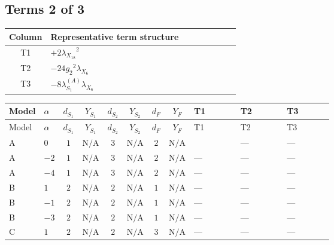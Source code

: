 \documentclass[8pt]{article}
\begin{document}
\begin{landscape}
\subsection*{Terms 2 of 3}
\begin{center}
\begin{tabular}{@{}c >{\raggedright\arraybackslash}p{0.82\linewidth}@{}}
\toprule
Column & Representative term structure \\
\midrule
T1 & \(\displaystyle +2 {\lambda_{X_{18}}}^2\) \\
\midrule
T2 & \(\displaystyle -24 {g_2}^2 {\lambda_{X_{6}}}\) \\
\midrule
T3 & \(\displaystyle -8 {\lambda_{S_1}^{(A)}} {\lambda_{X_{6}}}\) \\
\midrule
\bottomrule
\end{tabular}
\end{center}
\smallskip
\tiny
\begin{longtable}{@{}llcccccc >{\raggedright\arraybackslash}p{0.21\linewidth} >{\raggedright\arraybackslash}p{0.21\linewidth} >{\raggedright\arraybackslash}p{0.21\linewidth}@{}}
\toprule
Model & $\alpha$ & $d_{S_1}$ & $Y_{S_1}$ & $d_{S_2}$ & $Y_{S_2}$ & $d_F$ & $Y_F$ & T1 & T2 & T3 \\
\midrule
\endfirsthead
\toprule
Model & $\alpha$ & $d_{S_1}$ & $Y_{S_1}$ & $d_{S_2}$ & $Y_{S_2}$ & $d_F$ & $Y_F$ & T1 & T2 & T3 \\
\midrule
\endhead
A & $0$ & $1$ & $\text{N/A}$ & $3$ & $\text{N/A}$ & $2$ & $\text{N/A}$ & \scriptsize\adjustbox{max width=\linewidth}{$\begin{gathered} +2 {\lambda_{X_{18}}}^2\end{gathered}$} & --- & --- \\
\midrule
A & $-2$ & $1$ & $\text{N/A}$ & $3$ & $\text{N/A}$ & $2$ & $\text{N/A}$ & --- & --- & --- \\
\midrule
A & $-4$ & $1$ & $\text{N/A}$ & $3$ & $\text{N/A}$ & $2$ & $\text{N/A}$ & --- & --- & --- \\
\midrule
B & $1$ & $2$ & $\text{N/A}$ & $2$ & $\text{N/A}$ & $1$ & $\text{N/A}$ & --- & --- & --- \\
\midrule
B & $-1$ & $2$ & $\text{N/A}$ & $2$ & $\text{N/A}$ & $1$ & $\text{N/A}$ & --- & --- & --- \\
\midrule
B & $-3$ & $2$ & $\text{N/A}$ & $2$ & $\text{N/A}$ & $1$ & $\text{N/A}$ & --- & --- & --- \\
\midrule
C & $1$ & $2$ & $\text{N/A}$ & $2$ & $\text{N/A}$ & $3$ & $\text{N/A}$ & --- & --- & --- \\

\end{longtable}
\end{landscape}
\end{document}
